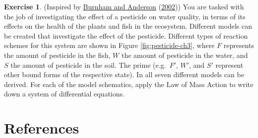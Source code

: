 \documentclass[
]{krantz}
\theoremstyle{definition}
\theoremstyle{definition}
\theoremstyle{definition}
\newtheorem{exercise}{Exercise}[chapter]
\theoremstyle{definition}
\theoremstyle{remark}
\begin{document}
\begin{exercise}
\protect\hypertarget{exr:unnamed-chunk-9}{}{\label{exr:unnamed-chunk-9} }(Inspired by \protect\hyperlink{ref-burnham_model_2002}{Burnham and Anderson} (\protect\hyperlink{ref-burnham_model_2002}{2002})) You are tasked with the job of investigating the effect of a pesticide on water quality, in terms of its effects on the health of the plants and fish in the ecosystem. Different models can be created that investigate the effect of the pesticide. Different types of reaction schemes for this system are shown in Figure \ref{fig:pesticide-ch3}, where \(F\) represents the amount of pesticide in the fish, \(W\) the amount of pesticide in the water, and \(S\) the amount of pesticide in the soil. The prime (e.g.~\(F'\), \(W'\), and \(S'\) represent other bound forms of the respective state). In all seven different models can be derived. For each of the model schematics, apply the Law of Mass Action to write down a system of differential equations.
\end{exercise}

\hypertarget{references}{%
\chapter*{References}\label{references}}
\end{document}
